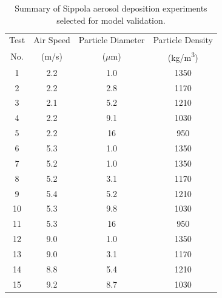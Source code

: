 \begin{table}[!ht]
\centering
\caption[Summary of Sippola aerosol deposition experiments selected for model validation]{Summary of Sippola aerosol deposition experiments selected for model validation.}
\begin{tabular}{|c|c|c|c|}
\hline
Test      &  Air Speed        &  Particle Diameter          &  Particle Density             \\
No.       &  (m/s)            &  ($\mu$m)                   &  (\unit{kg/m^3})                   \\ \hline \hline
1         &  2.2              &  1.0                        &  1350                         \\ \hline
2         &  2.2              &  2.8                        &  1170                         \\ \hline
3         &  2.1              &  5.2                        &  1210                         \\ \hline
4         &  2.2              &  9.1                        &  1030                         \\ \hline
5         &  2.2              &  16                         &  950                          \\ \hline
6         &  5.3              &  1.0                        &  1350                         \\ \hline
7         &  5.2              &  1.0                        &  1350                         \\ \hline
8         &  5.2              &  3.1                        &  1170                         \\ \hline
9         &  5.4              &  5.2                        &  1210                         \\ \hline
10        &  5.3              &  9.8                        &  1030                         \\ \hline
11        &  5.3              &  16                         &  950                          \\ \hline
12        &  9.0              &  1.0                        &  1350                         \\ \hline
13        &  9.0              &  3.1                        &  1170                         \\ \hline
14        &  8.8              &  5.4                        &  1210                         \\ \hline
15        &  9.2              &  8.7                        &  1030                         \\ \hline

\end{tabular}
\end{table}

